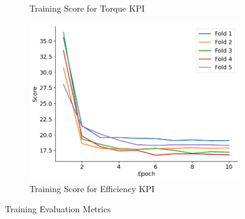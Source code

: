 \documentclass{report} %
\begin{document}
\begin{figure}[H]
\begin{subfigure}{0.32\textwidth}
        \caption{\centering Training Score for Torque \ac{KPI}}
        \label{fig:Training Score for Torque Curve}
    \end{subfigure}\hfill
    \begin{subfigure}{0.32\textwidth}
        \centering
        \includegraphics[width=\textwidth]{./ReportImages/train_score_y2.png}
        \caption{\centering Training Score for Efficiency \ac{KPI}}
        \label{fig:Training Score for Efficiency grid}
    \end{subfigure}
    \caption{Training Evaluation Metrics}
    \label{fig:Training Evaluation Metrics}
\end{figure}
\end{document}

